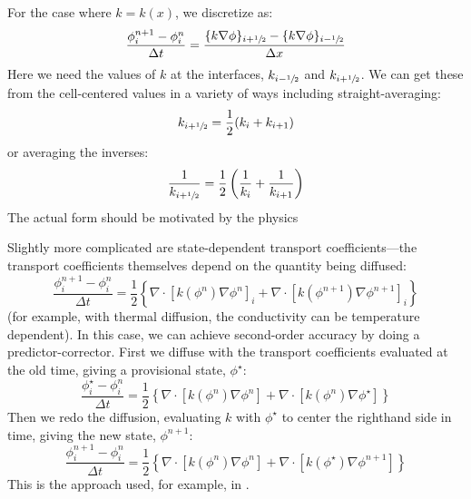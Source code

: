 For the case where $k = k(x)$,
  we discretize as:
  \begin{equation}
  \frac{\phi_i^{n+1} - \phi_i^n}{\Delta t} = 
        \frac{ \{ k \nabla \phi \}_{i+{\sfrac{1}{2}}} -
               \{ k \nabla \phi \}_{i-{\sfrac{1}{2}}}}{\Delta x}
  \end{equation}
 Here we need the values of $k$ at the interfaces, $k_{i-{\sfrac{1}{2}}}$ and
 $k_{i+{\sfrac{1}{2}}}$.  We can get these from the cell-centered values in a
 variety of ways including straight-averaging:
 \begin{equation}
 k_{i+{\sfrac{1}{2}}} = \frac{1}{2} (k_i + k_{i+1})
 \end{equation}
 or averaging the inverses:
 \begin{equation}
 \frac{1}{k_{i+{\sfrac{1}{2}}}} = \frac{1}{2} \left (\frac{1}{k_i} + \frac{1}{k_{i+1}} \right )
 \end{equation}
The actual form should be motivated by the physics
 
Slightly more complicated are state-dependent transport
coefficients---the transport coefficients themselves depend on the
quantity being diffused:
  \begin{equation}
  \frac{\phi_i^{n+1} - \phi_i^n}{\Delta t} = 
        \frac{1}{2} \left \{
               \nabla \cdot [ k(\phi^n) \nabla \phi^n ]_i +
               \nabla \cdot [ k(\phi^{n+1}) \nabla \phi^{n+1} ]_i 
               \right \}
  \end{equation}
  (for example, with thermal diffusion, the conductivity can
  be temperature dependent).  In this case, we can achieve second-order
  accuracy by doing a predictor-corrector.  First we diffuse with
  the transport coefficients evaluated at the old time, giving a provisional
  state, $\phi^\star$:
  \begin{equation}
  \frac{\phi_i^\star - \phi_i^n}{\Delta t} = 
        \frac{1}{2} \left \{
               \nabla \cdot [ k(\phi^n) \nabla \phi^n ] +
               \nabla \cdot [ k(\phi^n) \nabla \phi^\star ] 
               \right \}
  \end{equation}
  Then we redo the diffusion, evaluating $k$ with $\phi^\star$ to
  center the righthand side in time, giving the new state, $\phi^{n+1}$:
  \begin{equation}
  \frac{\phi_i^{n+1} - \phi_i^n}{\Delta t} = 
        \frac{1}{2} \left \{
               \nabla \cdot [ k(\phi^n) \nabla \phi^n ] +
               \nabla \cdot [ k(\phi^\star) \nabla \phi^{n+1} ] 
               \right \}
  \end{equation}
  This is the approach used, for example, in \cite{SNpaper}.


